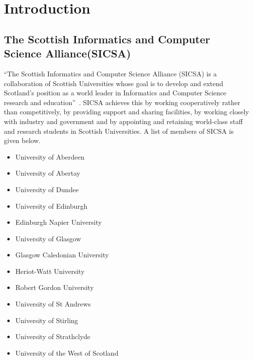 


\section{Introduction}

\subsection{The Scottish Informatics and Computer Science Alliance(SICSA)}

``The Scottish Informatics and Computer Science Alliance (SICSA) is a collaboration of Scottish Universities whose goal is to develop 
and extend Scotland's position as a world leader in Informatics and Computer Science research and education''~\cite{sicsa}. 
SICSA achieves this by working cooperatively rather than competitively, by providing support and sharing facilities, by working closely 
with industry and government and by appointing and retaining world-class staff and research students in Scottish Universities.
A list of members of SICSA is given below.

\begin{itemize}
 \item University of Aberdeen
 \item University of Abertay
 \item University of Dundee
 \item University of Edinburgh
 \item Edinburgh Napier University
 \item University of Glasgow
 \item Glasgow Caledonian University
 \item Heriot-Watt University
 \item Robert Gordon University
 \item University of St Andrews
 \item University of Stirling
 \item University of Strathclyde
 \item University of the West of Scotland
\end{itemize}

